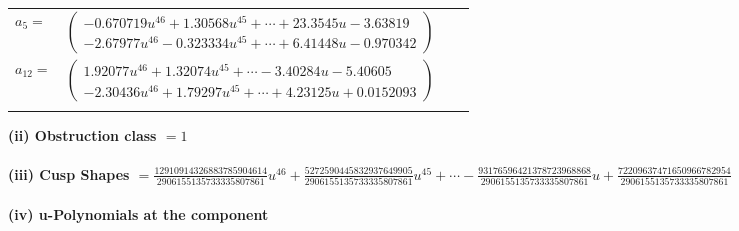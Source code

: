 \documentclass[1p]{elsarticle_modified}
\theoremstyle{definition}
\begin{document}
\begin{tabular}{m{7pt} m{180pt} m{7pt} m{180pt} }
\flushright $a_{5}=$&$\begin{pmatrix}-0.670719 u^{46}+1.30568 u^{45}+\cdots+23.3545 u-3.63819\\-2.67977 u^{46}-0.323334 u^{45}+\cdots+6.41448 u-0.970342\end{pmatrix}$ \\
\flushright $a_{12}=$&$\begin{pmatrix}1.92077 u^{46}+1.32074 u^{45}+\cdots-3.40284 u-5.40605\\-2.30436 u^{46}+1.79297 u^{45}+\cdots+4.23125 u+0.0152093\end{pmatrix}$\\&\end{tabular}
\flushleft \textbf{(ii) Obstruction class $= 1$}\\~\\
\flushleft \textbf{(iii) Cusp Shapes $= \frac{12910914326883785904614}{2906155135733335807861} u^{46}+\frac{5272590445832937649905}{2906155135733335807861} u^{45}+\cdots-\frac{93176596421378723968868}{2906155135733335807861} u+\frac{72209637471650966782954}{2906155135733335807861}$}\\~\\
\newpage\renewcommand{\arraystretch}{1}
\flushleft \textbf{(iv) u-Polynomials at the component}\newline \\
\end{document}
